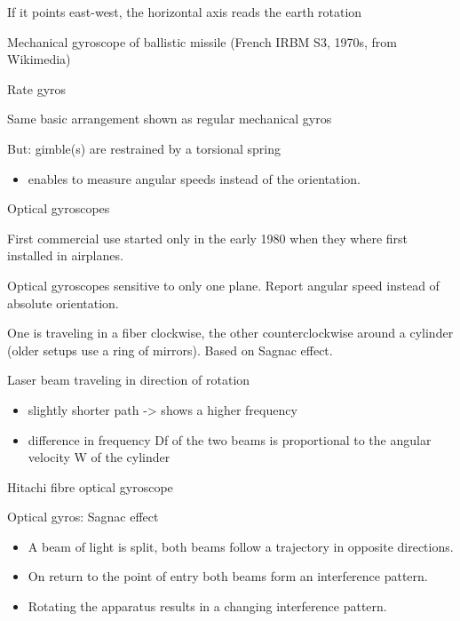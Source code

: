 \documentclass[compress]{beamer}
\begin{document}
\begin{frame}{If it points east-west, the horizontal axis reads the
earth rotation}

Mechanical gyroscope of ballistic missile (French IRBM S3, 1970s, from
Wikimedia)

\end{frame}

\begin{frame}{Rate gyros}

Same basic arrangement shown as regular mechanical gyros

But: gimble(s) are restrained by a torsional spring

\begin{itemize}

\item
  enables to measure angular speeds instead of the orientation.
\end{itemize}

\end{frame}

\begin{frame}{Optical gyroscopes}

First commercial use started only in the early 1980 when they where
first installed in airplanes.

Optical gyroscopes sensitive to only one plane. Report angular speed
instead of absolute orientation.

One is traveling in a fiber clockwise, the other counterclockwise around
a cylinder (older setups use a ring of mirrors). Based on Sagnac effect.

Laser beam traveling in direction of rotation

\begin{itemize}

\item
  slightly shorter path -\textgreater{} shows a higher frequency
\item
  difference in frequency Df of the two beams is proportional to the
  angular velocity W of the cylinder
\end{itemize}

Hitachi fibre optical gyroscope

\end{frame}

\begin{frame}{Optical gyros: Sagnac effect}

\begin{itemize}

\item
  A beam of light is split, both beams follow a trajectory in opposite
  directions.
\item
  On return to the point of entry both beams form an interference
  pattern.
\item
  Rotating the apparatus results in a changing interference pattern.
\end{itemize}

\end{frame}
\end{document}
